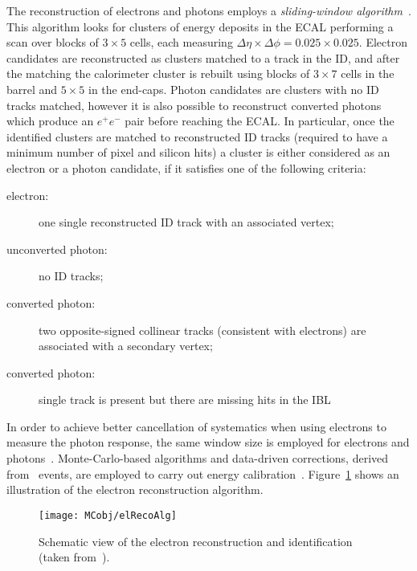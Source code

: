 			The reconstruction of electrons and photons employs a \emph{sliding-window algorithm}~\cite{ATL-PHYS-PUB-2016-015,Aad:2014nim}. This algorithm looks for clusters of energy deposits in the \ac{ECAL} performing a scan over blocks of $3 \times 5$ cells, each measuring $\Delta \eta \times \Delta \phi = 0.025 \times 0.025$. Electron candidates are reconstructed as clusters matched to a track in the \ac{ID}, and after the matching the calorimeter cluster is rebuilt using blocks of $3 \times 7$ cells in the barrel and $5 \times 5$ in the end-caps. Photon candidates are clusters with no \ac{ID} tracks matched, however it is also possible to reconstruct converted photons which produce an $e^+e^-$ pair before reaching the \ac{ECAL}. In particular, once the identified clusters are matched to reconstructed \ac{ID} tracks (required to have a minimum number of pixel and silicon hits) a cluster is either considered as an electron or a photon candidate, if it satisfies one of the following criteria:

			\begin{description}
				\item [electron:] one single reconstructed \ac{ID} track with an associated vertex;
				\item [unconverted photon:] no \ac{ID} tracks;
				\item [converted photon:] two opposite-signed collinear tracks (consistent with electrons) are associated with a secondary vertex;
				\item [converted photon:] single track is present but there are missing hits in the \ac{IBL}
			\end{description}

			In order to achieve better cancellation of systematics when using electrons to measure the photon response, the same window size is employed for electrons and photons~\cite{ATL-PHYS-PUB-2016-015}. Monte-Carlo-based algorithms and data-driven corrections, derived from \Zee\ events, are employed to carry out energy calibration~\cite{ATL-PHYS-PUB-2016-015}. Figure~\ref{fig:elRecoAlg} shows an illustration of the electron reconstruction algorithm.

			\begin{figure}[!htb]
				\centering
				\texttt{[image: MCobj/elRecoAlg]}
				\caption{\label{fig:elRecoAlg} Schematic view of the electron reconstruction and identification (taken from~\cite{ATLAS:2016iqc}).}
			\end{figure}

